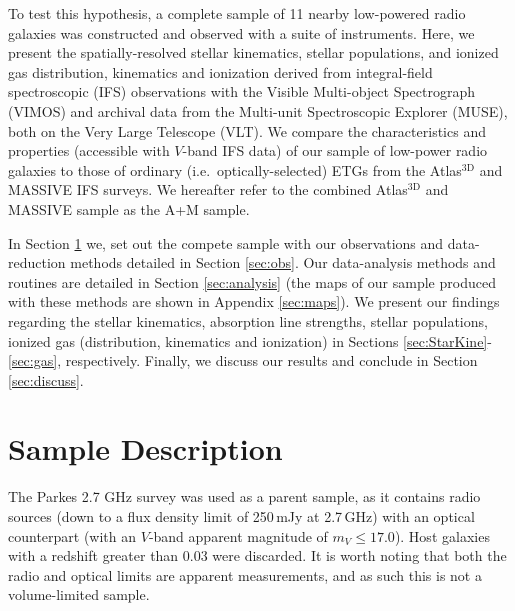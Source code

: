 \documentclass[a4paper,fleqn,usenatbib]{mnras}
\begin{document}
	To test this hypothesis, a complete sample of 11 nearby low-powered radio galaxies was constructed \citet{Prandoni2010} and observed with a suite of instruments. Here, we present the spatially-resolved stellar kinematics, stellar populations, and ionized gas distribution, kinematics and ionization derived from integral-field spectroscopic (IFS) observations with the Visible Multi-object Spectrograph (VIMOS) and archival data from the Multi-unit Spectroscopic Explorer (MUSE), both on the Very Large Telescope (VLT). We compare the characteristics and properties (accessible with $V$-band IFS data) of our sample of low-power radio galaxies to those of ordinary (i.e.\ optically-selected) ETGs from the Atlas$^\text{3D}$ and MASSIVE IFS surveys. We hereafter refer to the combined Atlas$^\text{3D}$ and MASSIVE sample as the A+M sample.

	In Section \ref{sec:samp} we, set out the compete sample with our observations and data-reduction methods detailed in Section \ref{sec:obs}. Our data-analysis methods and routines are detailed in Section \ref{sec:analysis} (the maps of our sample produced with these methods are shown in Appendix \ref{sec:maps}). We present our findings regarding the stellar kinematics, absorption line strengths, stellar populations, ionized gas (distribution, kinematics and ionization) in Sections \ref{sec:StarKine}-\ref{sec:gas}, respectively. Finally, we discuss our results and conclude in Section \ref{sec:discuss}.

\section{Sample Description}
	\label{sec:samp}
	The Parkes 2.7 GHz survey \citep{Ekers1989} was used as a parent sample, as it contains radio sources (down to a flux density limit of 250\,mJy at 2.7\,GHz) with an optical counterpart (with an $V$-band apparent magnitude of $m_V \le 17.0$). Host galaxies with a redshift greater than 0.03 were discarded. It is worth noting that both the radio and optical limits are apparent measurements, and as such this is not a volume-limited sample.
\end{document}
